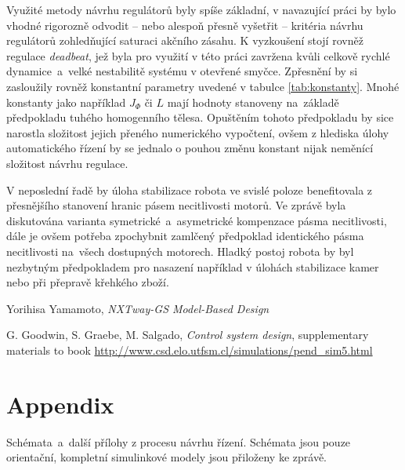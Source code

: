 \documentclass[conference]{IEEEtran}
\begin{document}
Využité metody návrhu regulátorů byly spíše základní, v navazující práci by bylo vhodné rigorozně odvodit -- nebo alespoň
přesně vyšetřit -- kritéria návrhu regulátorů zohledňující saturaci akčního zásahu.
K vyzkoušení stojí rovněž regulace \textit{deadbeat}, jež byla pro využití v této práci zavržena kvůli celkově rychlé dynamice~a~velké nestabilitě
systému v otevřené smyčce. Zpřesnění by si zasloužily rovněž konstantní parametry uvedené v tabulce \ref{tab:konstanty}.
Mnohé konstanty jako například $J_\varPhi$ či $L$ mají hodnoty stanoveny na~základě předpokladu tuhého homogenního tělesa.
Opuštěním tohoto předpokladu by sice narostla složitost jejich přeného numerického vypočtení, ovšem z hlediska úlohy automatického řízení
by se jednalo o pouhou změnu konstant nijak neměnící složitost návrhu regulace.

V neposlední řadě by úloha stabilizace robota ve svislé poloze benefitovala z přesnějšího stanovení hranic pásem necitlivosti
motorů. Ve zprávě byla diskutována varianta symetrické~a~asymetrické kompenzace pásma necitlivosti, dále je ovšem potřeba zpochybnit
zamlčený předpoklad identického pásma necitlivosti na~všech dostupných motorech. Hladký postoj robota by byl nezbytným předpokladem
pro nasazení například v úlohách stabilizace kamer nebo při přepravě křehkého zboží.



\begin{thebibliography}{9}
    
    Yorihisa Yamamoto, \emph{NXTway-GS Model-Based Design} 
    
     G. Goodwin, S. Graebe, M. Salgado, \emph{Control system design}, supplementary materials to book \url{http://www.csd.elo.utfsm.cl/simulations/pend_sim5.html}
    
\end{thebibliography}

\section{Appendix}

Schémata~a~další přílohy z procesu návrhu řízení. Schémata jsou pouze orientační, kompletní simulinkové modely jsou přiloženy ke zprávě.
\end{document}
